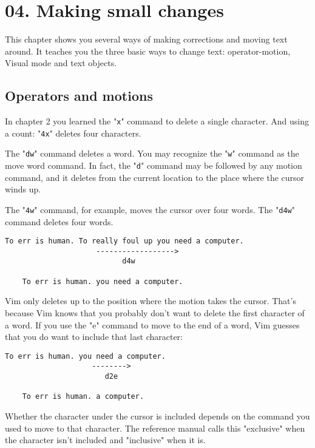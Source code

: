 \section{04. Making small changes}
This chapter shows you several ways of making corrections and moving text
around.  It teaches you the three basic ways to change text: operator-motion,
Visual mode and text objects.
\subsection{Operators and motions}

In chapter 2 you learned the "\texttt{x}" command to delete a single character.
And using a count: "\texttt{4x}" deletes four characters.

The "\texttt{dw}" command deletes a word.
You may recognize the "\texttt{w}" command as the move word command.
In fact, the "\texttt{d}" command may be followed by any motion command, and it deletes from the current location to the place where the cursor winds up.

The "\texttt{4w}" command, for example, moves the cursor over four words.
The "\texttt{d4w}" command deletes four words.

\begin{Verbatim}[samepage=true]
    To err is human. To really foul up you need a computer. 
                     ------------------>
                           d4w

    To err is human. you need a computer. 
\end{Verbatim}

Vim only deletes up to the position where the motion takes the cursor.
That's because Vim knows that you probably don't want to delete the first character of a word.
If you use the "e" command to move to the end of a word, Vim guesses that you do want to include that last character:

\begin{Verbatim}[samepage=true]
    To err is human. you need a computer. 
                    -------->
                       d2e

    To err is human. a computer. 
\end{Verbatim}

Whether the character under the cursor is included depends on the command you used to move to that character.
The reference manual calls this "exclusive" when the character isn't included and "inclusive" when it is.


